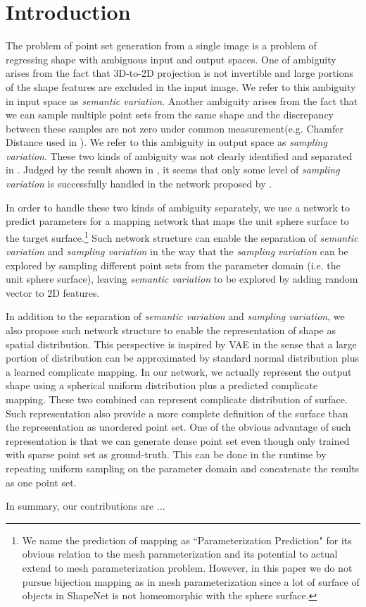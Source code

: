 \section{Introduction}
The problem of point set generation from a single image is a problem of regressing shape with ambiguous input and output spaces. One of ambiguity arises from the fact that 3D-to-2D projection is not invertible and large portions of the shape features are excluded in the input image. We refer to this ambiguity in input space as \textit{semantic variation}. Another ambiguity arises from the fact that we can sample multiple point sets from the same shape and the discrepancy between these samples are not zero under common measurement(e.g. Chamfer Distance used in \cite{PSGN}). We refer to this ambiguity in output space as \textit{sampling variation}. These two kinds of ambiguity was not clearly identified and separated in \cite{PSGN}. Judged by the result shown in \cite{PSGN}, it seems that only some level of \textit{sampling variation} is successfully handled in the network proposed by \cite{PSGN}.

In order to handle these two kinds of ambiguity separately, we use a network to predict parameters for a mapping network that maps the unit sphere surface to the target surface.\footnote{We name the prediction of mapping as ``Parameterization Prediction" for its obvious relation to the mesh parameterization and its potential to actual extend to mesh parameterization problem. However, in this paper we do not pursue bijection mapping as in mesh parameterization since a lot of surface of objects in ShapeNet is not homeomorphic with the sphere surface.} Such network structure can enable the separation of \textit{semantic variation} and \textit{sampling variation} in the way that the \textit{sampling variation} can be explored by sampling different point sets from the parameter domain (i.e. the unit sphere surface), leaving \textit{semantic variation} to be explored by adding random vector to 2D features.

In addition to the separation of \textit{semantic variation} and \textit{sampling variation}, we also propose such network structure to enable the representation of shape as spatial distribution. This perspective is inspired by VAE\cite{VAE} in the sense that a large portion of distribution can be approximated by standard normal distribution plus a learned complicate mapping. In our network, we actually represent the output shape using a spherical uniform distribution plus a predicted complicate mapping. These two combined can represent complicate distribution of surface. Such representation also provide a more complete definition of the surface than the representation as unordered point set. One of the obvious advantage of such representation is that we can generate dense point set even though only trained with sparse point set as ground-truth. This can be done in the runtime by repeating uniform sampling on the parameter domain and concatenate the results as one point set. 

In summary, our contributions are ...             

